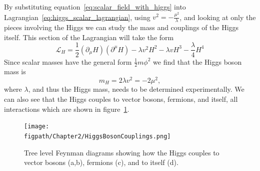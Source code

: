 By substituting equation~\ref{eq:scalar_field_with_higgs} into Lagrangian~\ref{eq:higgs_scalar_lagrangian}, using $v^{2}=-\frac{\mu^{2}}{\lambda}$, and looking at only the pieces involving the Higgs we can study the mass and couplings of the Higgs itself.
This section of the Lagrangian will take the form
\begin{equation}
	\mathcal{L}_{H}=\frac{1}{2}\left(\partial_{\mu}H\right)\left(\partial^{\mu}H\right)-{\lambda}v^{2}H^{2}-{\lambda}vH^{3}-\frac{\lambda}{4}H^{4}
\end{equation}
Since scalar masses have the general form $\frac{1}{2}m\phi^{2}$ we find that the Higgs boson mass is
\begin{equation}\label{eq:higgs_boson_mass}
	m_{H}=2{\lambda}v^{2}=-2\mu^{2},
\end{equation}
where $\lambda$, and thus the Higgs mass, needs to be determined experimentally.
We can also see that the Higgs couples to vector bosons, fermions, and itself, all interactions which are shown in figure~\ref{fig:higgs_boson_couplings}.

\begin{figure}[hbt]
    \centering
    \texttt{[image: \\figpath/Chapter2/HiggsBosonCouplings.png]}
    \caption{Tree level Feynman diagrams showing how the Higgs couples to vector bosons (a,b), fermions (c), and to itself (d).}
    \label{fig:higgs_boson_couplings}
\end{figure}

